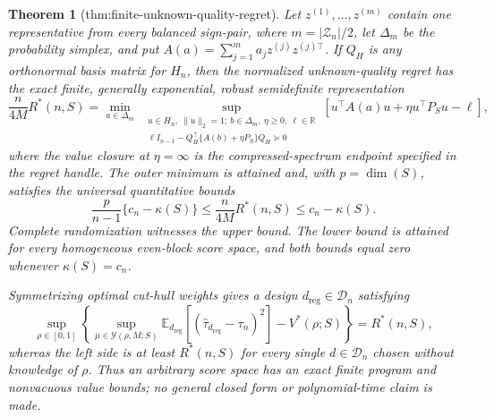 \documentclass{article}
\newtheorem{theorem}{Theorem}
\begin{document}
\begin{theorem}[thm:finite-unknown-quality-regret]\label{thm:finite-unknown-quality-regret}
Let \(z^{(1)},\ldots,z^{(m)}\) contain one representative from every balanced sign-pair, where \(m=|\mathcal Z_n|/2\), let \(\Delta_m\) be the probability simplex, and put \(A(a)=\sum_{j=1}^m a_jz^{(j)}z^{(j)\top}\).  If \(Q_H\) is any orthonormal basis matrix for \(H_n\), then the normalized unknown-quality regret has the exact finite, generally exponential, robust semidefinite representation
\[
\frac{n}{4M}R^*(n,S)
=\min_{a\in\Delta_m}\ \sup_{\substack{u\in H_n,\ \|u\|_2=1;\ b\in\Delta_m,\ \eta\geq0,\ \ell\in\mathbb R\\
\ell I_{n-1}-Q_H^\top\{A(b)+\eta P_S\}Q_H\succeq0}}
\left[u^\top A(a)u+\eta u^\top P_Su-\ell\right],
\]
where the value closure at \(\eta=\infty\) is the compressed-spectrum endpoint specified in the regret handle.  The outer minimum is attained and, with \(p=\dim(S)\), satisfies the universal quantitative bounds
\[
\frac{p}{n-1}\{c_n-\kappa(S)\}
\leq\frac{n}{4M}R^*(n,S)
\leq c_n-\kappa(S).
\]
Complete randomization witnesses the upper bound.  The lower bound is attained for every homogeneous even-block score space, and both bounds equal zero whenever \(\kappa(S)=c_n\).

Symmetrizing optimal cut-hull weights gives a design \(d_{\mathrm{reg}}\in\mathcal D_n\) satisfying
\[
\sup_{\rho\in[0,1]}
\left\{
\sup_{\mu\in\mathcal Y(\rho,M;S)}
\mathbb E_{d_{\mathrm{reg}}}[(\widehat\tau_{d_{\mathrm{reg}}}-\tau_n)^2]
-V^*(\rho;S)
\right\}=R^*(n,S),
\]
whereas the left side is at least \(R^*(n,S)\) for every single \(d\in\mathcal D_n\) chosen without knowledge of \(\rho\).  Thus an arbitrary score space has an exact finite program and nonvacuous value bounds; no general closed form or polynomial-time claim is made.
\end{theorem}
\end{document}

